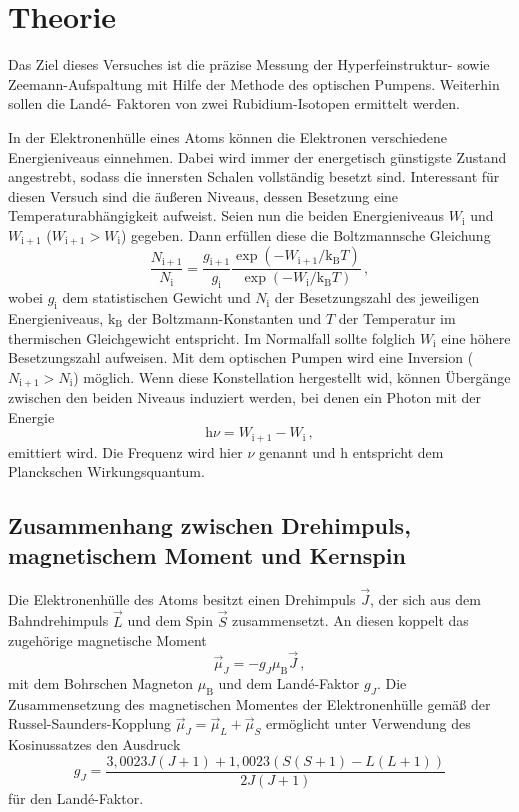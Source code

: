 \section{Theorie}
\label{sec:Theorie}
Das Ziel dieses Versuches ist die präzise Messung der Hyperfeinstruktur- sowie
Zeemann-Aufspaltung mit Hilfe der Methode des optischen Pumpens. Weiterhin sollen die Land\'{e}-
Faktoren von zwei Rubidium-Isotopen ermittelt werden.

In der Elektronenhülle eines Atoms können die Elektronen verschiedene Energieniveaus einnehmen. 
Dabei wird immer der energetisch günstigste Zustand angestrebt, sodass die innersten Schalen
vollständig besetzt sind. Interessant für diesen Versuch sind die äußeren Niveaus, dessen 
Besetzung eine Temperaturabhängigkeit aufweist. Seien nun die beiden Energieniveaus 
$W_{\mathrm{i}}$ und $W_{\mathrm{i}+1}$ ($W_{\mathrm{i}+1} >  W_{\mathrm{i}}$) gegeben.
Dann erfüllen diese die Boltzmannsche Gleichung
\begin{equation}
	\frac{N_{\mathrm{i}+1}}{N_{\mathrm{i}}} = \frac{g_{\mathrm{i}+1}}{g_{\mathrm{i}}} \frac{\exp(-W_{\mathrm{i}+1} / \mathrm{k}_{\mathrm{B}}T)}{\exp(-W_{\mathrm{i}} / \mathrm{k}_{\mathrm{B}}T)} \, \mathrm{,}
\end{equation}
wobei $g_{\mathrm{i}}$ dem statistischen Gewicht und $N_{\mathrm{i}}$ der Besetzungszahl 
des jeweiligen Energieniveaus, 
$\mathrm{k}_{\mathrm{B}}$ der Boltzmann-Konstanten und $T$ der Temperatur im thermischen 
Gleichgewicht entspricht.
Im Normalfall sollte folglich $W_{\mathrm{i}}$ eine höhere Besetzungszahl aufweisen. 
Mit dem optischen Pumpen wird eine Inversion ($N_{\mathrm{i}+1} > N_{\mathrm{i}}$) möglich.
Wenn diese Konstellation hergestellt wid, können Übergänge zwischen den beiden Niveaus 
induziert werden, bei denen ein Photon mit der Energie 
\begin{equation}
	\mathrm{h} \nu = W_{\mathrm{i}+1} - W_{\mathrm{i}} \, \mathrm{,}
\end{equation}
emittiert wird. Die Frequenz wird hier $\nu$ genannt und h entspricht dem Planckschen 
Wirkungsquantum.

\subsection{Zusammenhang zwischen Drehimpuls, magnetischem Moment und Kernspin}

Die Elektronenhülle des Atoms besitzt einen Drehimpuls $\vec{J}$, der sich aus dem
Bahndrehimpuls $\vec{L}$ und dem Spin $\vec{S}$ zusammensetzt. An diesen koppelt das
zugehörige magnetische Moment
\begin{equation}
	\vec{\mu}_J = - g_J \mu_{\mathrm{B}} \vec{J} \, \mathrm{,}
\end{equation}
mit dem Bohrschen Magneton $\mu_{\mathrm{B}}$ und dem Land\'{e}-Faktor $g_J$.
Die Zusammensetzung des magnetischen Momentes der Elektronenhülle gemäß der
Russel-Saunders-Kopplung $\vec{\mu}_J = \vec{\mu}_L + \vec{\mu}_S$ ermöglicht unter
Verwendung des Kosinussatzes den Ausdruck
\begin{equation}
	g_J = \frac{3,0023 J(J+1) + 1,0023 (S(S+1)-L(L+1))}{2J(J+1)}
\end{equation}
für den Land\'{e}-Faktor.

